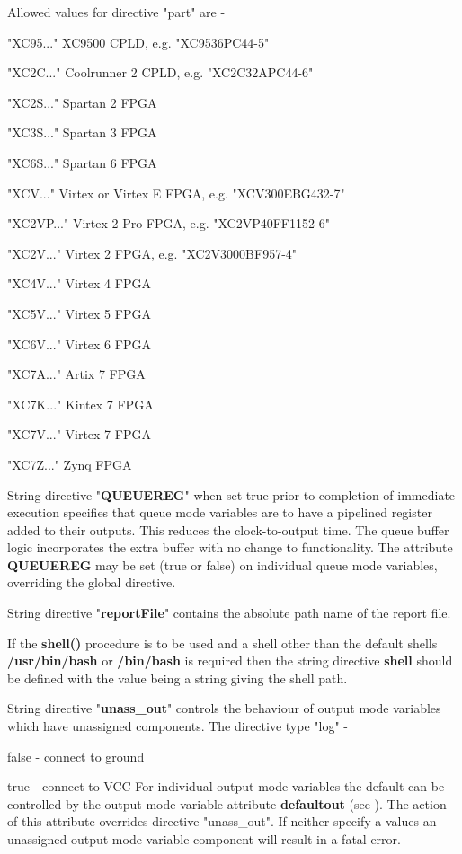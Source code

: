         Allowed values for directive "part" are -                       
        \blist
        \item   "XC95..." XC9500 CPLD, e.g. "XC9536PC44-5"
        \item   "XC2C..." Coolrunner 2 CPLD, e.g. "XC2C32APC44-6"
        \item   "XC2S..." Spartan 2 FPGA
        \item   "XC3S..." Spartan 3 FPGA
        \item   "XC6S..." Spartan 6 FPGA
        \item   "XCV..." Virtex or Virtex E FPGA, e.g. "XCV300EBG432-7"
        \item   "XC2VP..." Virtex 2 Pro FPGA, e.g. "XC2VP40FF1152-6"
        \item   "XC2V..." Virtex 2 FPGA, e.g. "XC2V3000BF957-4"
        \item   "XC4V..." Virtex 4 FPGA
        \item   "XC5V..." Virtex 5 FPGA
        \item   "XC6V..." Virtex 6 FPGA
        \item   "XC7A..." Artix 7 FPGA
        \item   "XC7K..." Kintex 7 FPGA
        \item   "XC7V..." Virtex 7 FPGA
        \item   "XC7Z..." Zynq FPGA
        \blend

        String directive "{\bf QUEUEREG}" when set true prior to
        completion of immediate execution specifies that queue mode variables are
        to have a pipelined register added to their outputs. This reduces the
        clock-to-output time. The queue buffer logic incorporates the extra
        buffer with no change to functionality. The attribute {\bf QUEUEREG} may
        be set (true or false) on individual queue mode variables, overriding
        the global directive.

        String directive "{\bf reportFile}" contains the absolute path name
        of the report file.

        If the {\bf shell()}  procedure is to be used and
        a shell other than the default shells {\bf /usr/bin/bash} or {\bf
        /bin/bash} is required then the string directive {\bf shell} should be
        defined with the value being a string giving the shell path.

        String directive "{\bf unass\_out}" controls the behaviour of
        output mode variables which have unassigned components. The directive
        type "log" -
        \blist
        \item   false - connect to ground
        \item   true - connect to VCC
        \blend
        For individual output mode variables the default can be controlled
        by the output mode variable attribute {\bf defaultout} (see
        ). The action of this attribute overrides
        directive "unass\_out". If neither specify a values an unassigned output
        mode variable component will result in a fatal error.

